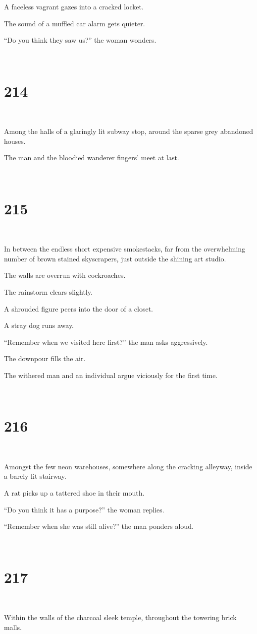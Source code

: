 \documentclass{report}
\begin{document}
A faceless vagrant gazes into a cracked locket.

The sound of a muffled car alarm gets quieter.

``Do you think they saw us?'' the woman wonders.

~
\chapter*{214}
~

Among the halls of a glaringly lit subway stop, around the sparse grey abandoned houses.

The man and the bloodied wanderer fingers' meet at last.

~
\chapter*{215}
~

In between the endless short expensive smokestacks, far from the overwhelming number of brown stained skyscrapers, just outside the shining art studio.

The walls are overrun with cockroaches.

The rainstorm clears slightly.

A shrouded figure peers into the door of a closet.

A stray dog runs away.

``Remember when we visited here first?'' the man asks aggressively.

The downpour fills the air.

The withered man and an individual argue viciously for the first time.

~
\chapter*{216}
~

Amongst the few neon warehouses, somewhere along the cracking alleyway, inside a barely lit stairway.

A rat picks up a tattered shoe in their mouth.

``Do you think it has a purpose?'' the woman replies.

``Remember when she was still alive?'' the man ponders aloud.

~
\chapter*{217}
~

Within the walls of the charcoal sleek temple, throughout the towering brick malls.
\end{document}
